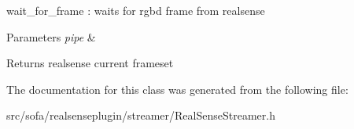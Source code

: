 wait\+\_\+for\+\_\+frame \+: waits for rgbd frame from realsense 


\begin{DoxyParams}{Parameters}
{\em pipe} & \\
\hline
\end{DoxyParams}
\begin{DoxyReturn}{Returns}
realsense current frameset 
\end{DoxyReturn}


The documentation for this class was generated from the following file\+:\begin{DoxyCompactItemize}
\item 
src/sofa/realsenseplugin/streamer/Real\+Sense\+Streamer.\+h\end{DoxyCompactItemize}
